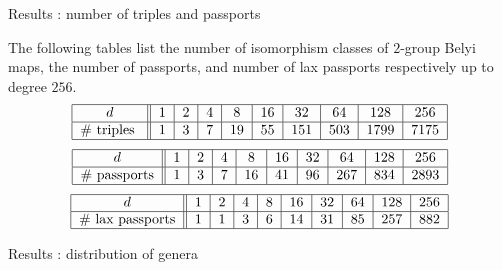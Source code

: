 \documentclass[xcolor=dvipsnames]{beamer}
\theoremstyle{plain}
\begin{document}
{    \begin{frame}{Results : number of triples and passports}
      \begin{theorem}[M.]
        \vspace{1pt}
        The following tables list
        the number of isomorphism classes of
        $2$-group Belyi maps,
        the number of passports, and number of
        lax passports respectively
        up to degree $256$.
        \begin{equation*}
          \begin{tabular}{|c||c|c|c|c|c|c|c|c|c|}
            \hline
            $d$ & $1$ & $2$ & $4$ & $8$ & $16$ & $32$ & $64$ & $128$ & $256$\\
            \hline
            \#\text{ triples } & $1$ & $3$ & $7$ & $19$ & $55$ & $151$ & $503$ & $1799$ & $7175$\\
            \hline
          \end{tabular}
        \end{equation*}
        \begin{equation*}
          \begin{tabular}{|c||c|c|c|c|c|c|c|c|c|}
            \hline
            $d$ & $1$ & $2$ & $4$ & $8$ & $16$ & $32$ & $64$ & $128$ & $256$\\
            \hline
            \# passports & $1$ & $3$ & $7$ & $16$ & $41$ & $96$ & $267$ & $834$ & $2893$\\
            \hline
          \end{tabular}
        \end{equation*}
        \begin{equation*}
          \begin{tabular}{|c||c|c|c|c|c|c|c|c|c|}
            \hline
            $d$ & $1$ & $2$ & $4$ & $8$ & $16$ & $32$ & $64$ & $128$ & $256$\\
            \hline
            \# lax passports & $1$ & $1$ & $3$ & $6$ & $14$ & $31$ & $85$ & $257$ & $882$\\
            \hline
          \end{tabular}
        \end{equation*}
      \end{theorem}
    \end{frame}
    \begin{frame}[fragile]{Results : distribution of genera}
      \begin{figure}[ht]
        \centering
        \begin{tikzpicture}[scale=1]

\end{tikzpicture}
\end{figure}
\end{frame}}
\end{document}
